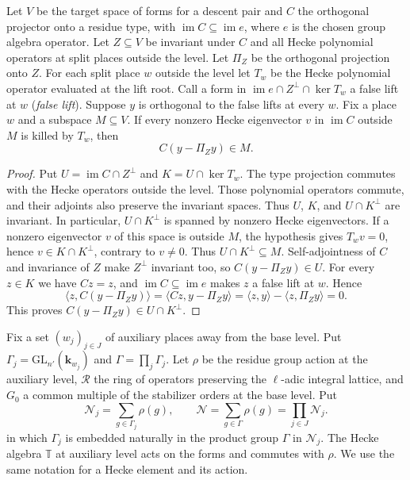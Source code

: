 \begin{lemma}
\label{lem:c-type-projection-false}
\emitthmsource
Let $V$ be the target space of forms for a descent pair and $C$ the orthogonal projector onto a residue type, with $\operatorname{im}C\subseteq\operatorname{im}e$, where $e$ is the chosen group algebra operator.
Let $Z\subseteq V$ be invariant under $C$ and all Hecke polynomial operators at split places outside the level. Let $\Pi_Z$ be the orthogonal projection onto $Z$.
For each split place $w$ outside the level let $T_w$ be the Hecke polynomial operator evaluated at the lift root. Call a form in $\operatorname{im}e\cap Z^\perp\cap\ker T_w$ a false lift at $w$ (\emph{false lift}).
Suppose $y$ is orthogonal to the false lifts at every $w$. Fix a place $w$ and a subspace $M\subseteq V$. If every nonzero Hecke eigenvector $v$ in $\operatorname{im}C$ outside $M$ is killed by $T_w$, then
\[
 C(y-\Pi_Zy)\in M .
\]
\end{lemma}
\begin{proof}
Put $U=\operatorname{im}C\cap Z^\perp$ and $K=U\cap\ker T_w$.
The type projection commutes with the Hecke operators outside the level. Those polynomial operators commute, and their adjoints also preserve the invariant spaces. Thus $U$, $K$, and $U\cap K^\perp$ are invariant.
In particular, $U\cap K^\perp$ is spanned by nonzero Hecke eigenvectors.
If a nonzero eigenvector $v$ of this space is outside $M$, the hypothesis gives $T_wv=0$, hence $v\in K\cap K^\perp$, contrary to $v\ne0$. Thus $U\cap K^\perp\subseteq M$.
Self-adjointness of $C$ and invariance of $Z$ make $Z^\perp$ invariant too, so $C(y-\Pi_Zy)\in U$. For every $z\in K$ we have $Cz=z$, and $\operatorname{im}C\subseteq\operatorname{im}e$ makes $z$ a false lift at $w$. Hence
\[
 \langle z,C(y-\Pi_Zy)\rangle
  =\langle Cz,y-\Pi_Zy\rangle
  =\langle z,y\rangle-\langle z,\Pi_Zy\rangle=0 .
\]
This proves $C(y-\Pi_Zy)\in U\cap K^\perp$.
\end{proof}

Fix a set $(w_j)_{j\in J}$ of auxiliary places away from the base level.
Put $\Gamma_j=\mathrm{GL}_{n'}(\mathbf k_{w_j})$ and $\Gamma=\prod_j\Gamma_j$. Let $\rho$ be the residue group action at the auxiliary level, $\mathcal R$ the ring of operators preserving the $\ell$-adic integral lattice, and $G_0$ a common multiple of the stabilizer orders at the base level. Put
\[
 \mathcal N_j=\sum_{g\in\Gamma_j}\rho(g),\qquad
 \mathcal N=\sum_{g\in\Gamma}\rho(g)=\prod_{j\in J}\mathcal N_j .
\]
in which $\Gamma_j$ is embedded naturally in the product group $\Gamma$ in $\mathcal N_j$. The Hecke algebra $\mathbb T$ at auxiliary level acts on the forms and commutes with $\rho$. We use the same notation for a Hecke element and its action.

